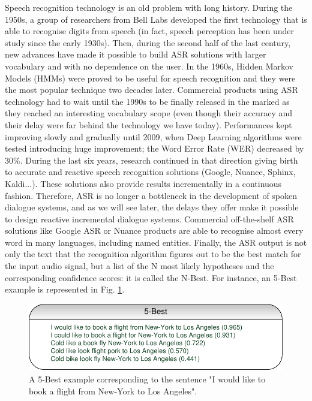 		Speech recognition technology is an old problem with long history. During the 1950s, a group of researchers from Bell Labs developed the first technology that is able to recognise digits from speech (in fact, speech perception has been under study since the early 1930s). Then, during the second half of the last century, new advances have made it possible to build ASR solutions with larger vocabulary and with no dependence on the user. In the 1960s, Hidden Markov Models (HMMs) were proved to be useful for speech recognition \cite{Gales2007} and they were the most popular technique two decades later. Commercial products using ASR technology had to wait until the 1990s to be finally released in the marked as they reached an interesting vocabulary scope (even though their accuracy and their delay were far behind the technology we have today). Performances kept improving slowly and gradually until 2009, when Deep Learning algorithms were tested introducing huge improvement; the Word Error Rate (WER) decreased by 30\%. During the last six years, research continued in that direction giving birth to accurate and reactive speech recognition solutions (Google, Nuance, Sphinx, Kaldi...). These solutions also provide results incrementally in a continuous fashion. Therefore, ASR is no longer a bottleneck in the development of spoken dialogue systems, and as we will see later, the delays they offer make it possible to design reactive incremental dialogue systems. Commercial off-the-shelf ASR solutions like Google ASR or Nuance products are able to recognise almost every word in many languages, including named entities. Finally, the ASR output is not only the text that the recognition algorithm figures out to be the best match for the input audio signal, but a list of the N most likely hypotheses and the corresponding confidence scores: it is called the N-Best. For instance, an 5-Best example is represented in Fig. \ref{fig:dialchain}.
		
		\begin{figure}
			\centering
			\includegraphics[scale=1]{figures/5BestEx.pdf}
			\caption{A 5-Best example corresponding to the sentence "I would like to book a flight from New-York to Los Angeles".}
			\label{fig:dialchain}
		\end{figure}
		
